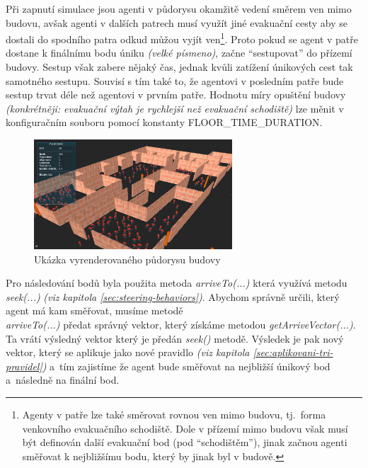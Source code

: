 \documentclass[czech,public,dept460,male,cpdeclaration]{diploma}
\begin{document}
	



Při zapnutí simulace jsou agenti v půdorysu okamžitě vedení směrem ven mimo budovu, avšak agenti v dalších patrech musí využít jiné evakuační cesty aby se dostali do spodního patra odkud můžou vyjít ven\footnote{Agenty v patře lze také směrovat rovnou ven mimo budovu, tj.~forma venkovního evakuačního schodiště. Dole v přízemí mimo budovu však musí být definován další evakuační bod (pod ``schodištěm''), jinak začnou agenti směřovat k nejbližšímu bodu, který by jinak byl v budově.}. Proto pokud se agent v patře dostane k finálnímu bodu úniku \textit{(velké písmeno)}, začne ``sestupovat'' do přízemí budovy. Sestup však zabere nějaký čas, jednak kvůli zatížení únikových cest tak samotného sestupu. Souvisí s tím také to, že agentovi v posledním patře bude sestup trvat déle než agentovi v prvním patře. Hodnotu míry opuštění budovy \textit{(konkrétněji: evakuační výtah je rychlejší než evakuační schodiště)} lze měnit v konfiguračním souboru pomocí konstanty FLOOR\_TIME\_DURATION.

\begin{figure}[H]\centering\includegraphics[width=0.66\textwidth]{Figures/screen5.jpg}
	\caption{Ukázka vyrenderovaného půdorysu budovy}
\end{figure}

Pro následování bodů byla použita metoda \textit{arriveTo(...)} která využívá metodu \textit{seek(...)} \textit{(viz kapitola \ref{sec:steering-behaviors})}. Abychom správně určili, který agent má kam směřovat, musíme metodě\\\textit{arriveTo(...)} předat správný vektor, který získáme metodou \textit{getArriveVector(...)}. Ta vrátí výsledný vektor který je předán \textit{seek()} metodě. Výsledek je pak nový vektor, který se aplikuje jako nové pravidlo \textit{(viz kapitola \ref{sec:aplikovani-tri-pravidel})} a~tím zajistíme že agent bude směřovat na nejbližší únikový bod a~následně na finální bod. 
\end{document}
